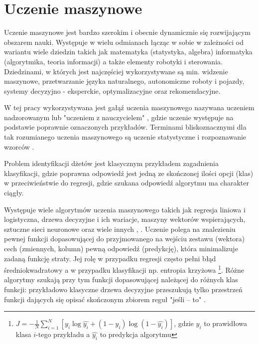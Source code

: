 \clearpage
\section{Uczenie maszynowe}
\label{sec:ml}

Uczenie maszynowe jest bardzo szerokim i obecnie dynamicznie się rozwijającym obszarem nauki. Występuje w wielu odmianach łącząc w sobie w zależności od wariantu wiele dziedzin takich jak matematyka (statystyka, algebra) informatyka (algorytmika, teoria informacji) a także elementy robotyki i sterowania. 
Dziedzinami, w których jest najczęściej wykorzystywane są min. widzenie maszynowe, przetwarzanie języka naturalnego, autonomiczne roboty i pojazdy, systemy decyzyjno - eksperckie, optymalizacyjne oraz rekomendacyjne.

W tej pracy wykorzystywana jest gałąź uczenia maszynowego nazywana uczeniem nadzorowanym lub "uczeniem z nauczycielem" , gdzie uczenie występuje na podstawie poprawnie oznaczonych przykładów. Terminami bliskoznacznymi dla tak rozumianego uczenia maszynowego są uczenie statystyczne  i rozpoznawanie wzorców .

Problem identyfikacji dżetów jest klasycznym przykładem zagadnienia klasyfikacji, gdzie poprawna odpowiedź jest jedną ze skończonej ilości opcji (klas) w przeciwieństwie do regresji, gdzie szukana odpowiedź algorytmu ma charakter ciągły. 

Występuje wiele algorytmów uczenia maszynowego takich jak regresja liniowa i logistyczna, drzewa decyzyjne i ich wariacje, maszyny wektorów wspierających, sztuczne sieci neuronowe oraz wiele innych \cite{kotsiantis2007supervised}, \cite{wolter2012metody}. 
Uczenie polega na znalezieniu pewnej funkcji dopasowującej do przyjmowanego na wejściu zestawu (wektora) cech (zmiennych, kolumn) pewną odpowiedź (predykcję), która minimalizuje zadaną funkcję straty. Jej rolę w przypadku regresji często pełni błąd średniokwadratowy a w przypadku klasyfikacji np. entropia krzyżowa  \footnote{$J = -\frac{1}{N} \sum\limits_{i=1}^N \left[y_i \log\hat{y_i} + (1-y_i)\log(1-\hat{y_i}) \right]$, gdzie $y_i$ to prawidłowa klasa $i$-tego przykładu a $\hat{y_i}$ to predykcja algorytmu}. 
Różne algorytmy szukają przy tym funkcji dopasowującej należącej do różnych klas funkcji: przykładowo klasyczne drzewa decyzyjne przeszukują tylko przestrzeń funkcji dających się opisać skończonym zbiorem reguł "jeśli -- to" .

